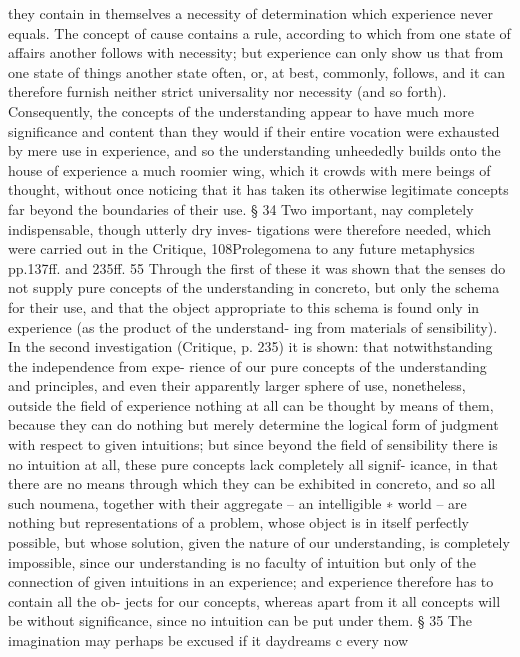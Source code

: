 they contain in themselves a necessity of determination which experience
never equals. The concept of cause contains a rule, according to which
from one state of affairs another follows with necessity; but experience
can only show us that from one state of things another state often, or,
at best, commonly, follows, and it can therefore furnish neither strict
universality nor necessity (and so forth).
Consequently, the concepts of the understanding appear to have much
more signiﬁcance and content than they would if their entire vocation
were exhausted by mere use in experience, and so the understanding
unheededly builds onto the house of experience a much roomier wing,
which it crowds with mere beings of thought, without once noticing that
it has taken its otherwise legitimate concepts far beyond the boundaries
of their use.
§ 34
Two important, nay completely indispensable, though utterly dry inves-
tigations were therefore needed, which were carried out in the Critique,
108Prolegomena to any future metaphysics
pp.137ff. and 235ff. 55 Through the ﬁrst of these it was shown that the
senses do not supply pure concepts of the understanding in concreto, but
only the schema for their use, and that the object appropriate to this
schema is found only in experience (as the product of the understand-
ing from materials of sensibility). In the second investigation (Critique,
p. 235) it is shown: that notwithstanding the independence from expe-
rience of our pure concepts of the understanding and principles, and
even their apparently larger sphere of use, nonetheless, outside the ﬁeld
of experience nothing at all can be thought by means of them, because
they can do nothing but merely determine the logical form of judgment
with respect to given intuitions; but since beyond the ﬁeld of sensibility
there is no intuition at all, these pure concepts lack completely all signif-
icance, in that there are no means through which they can be exhibited
in concreto, and so all such noumena, together with their aggregate – an
intelligible ∗ world – are nothing but representations of a problem, whose
object is in itself perfectly possible, but whose solution, given the nature
of our understanding, is completely impossible, since our understanding
is no faculty of intuition but only of the connection of given intuitions
in an experience; and experience therefore has to contain all the ob-
jects for our concepts, whereas apart from it all concepts will be without
signiﬁcance, since no intuition can be put under them.
§ 35
The imagination may perhaps be excused if it daydreams c every now
